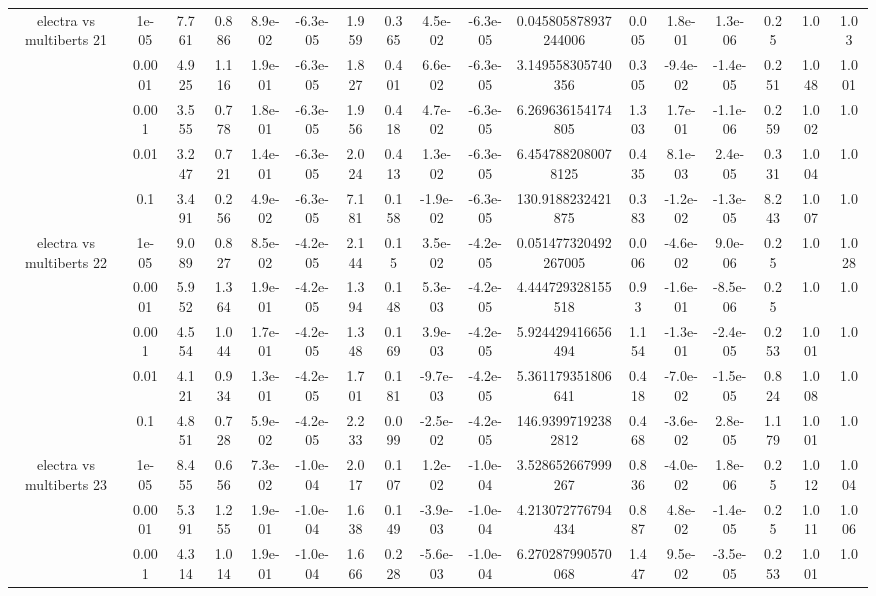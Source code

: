 \begin{tabular}{|c|c|c|c|c|c|c|c|c|c|c|c|c|c|c|c|c|}
\hline
\multirow{5}{*}{electra  vs multiberts 21} & 1e-05 & 7.761 & 0.886 & 8.9e-02 & -6.3e-05 & 1.959 & 0.365 & 4.5e-02 & -6.3e-05 & 0.045805878937244006 & 0.005 & 1.8e-01 & 1.3e-06 & 0.25 & 1.0 & 1.03 \\
 & 0.0001 & 4.925 & 1.116 & 1.9e-01 & -6.3e-05 & 1.827 & 0.401 & 6.6e-02 & -6.3e-05 & 3.149558305740356 & 0.305 & -9.4e-02 & -1.4e-05 & 0.251 & 1.048 & 1.001 \\
 & 0.001 & 3.555 & 0.778 & 1.8e-01 & -6.3e-05 & 1.956 & 0.418 & 4.7e-02 & -6.3e-05 & 6.269636154174805 & 1.303 & 1.7e-01 & -1.1e-06 & 0.259 & 1.002 & 1.0 \\
 & 0.01 & 3.247 & 0.721 & 1.4e-01 & -6.3e-05 & 2.024 & 0.413 & 1.3e-02 & -6.3e-05 & 6.4547882080078125 & 0.435 & 8.1e-03 & 2.4e-05 & 0.331 & 1.004 & 1.0 \\
 & 0.1 & 3.491 & 0.256 & 4.9e-02 & -6.3e-05 & 7.181 & 0.158 & -1.9e-02 & -6.3e-05 & 130.9188232421875 & 0.383 & -1.2e-02 & -1.3e-05 & 8.243 & 1.007 & 1.0 \\
\hline
\multirow{5}{*}{electra  vs multiberts 22} & 1e-05 & 9.089 & 0.827 & 8.5e-02 & -4.2e-05 & 2.144 & 0.15 & 3.5e-02 & -4.2e-05 & 0.051477320492267005 & 0.006 & -4.6e-02 & 9.0e-06 & 0.25 & 1.0 & 1.028 \\
 & 0.0001 & 5.952 & 1.364 & 1.9e-01 & -4.2e-05 & 1.394 & 0.148 & 5.3e-03 & -4.2e-05 & 4.444729328155518 & 0.93 & -1.6e-01 & -8.5e-06 & 0.25 & 1.0 & 1.0 \\
 & 0.001 & 4.554 & 1.044 & 1.7e-01 & -4.2e-05 & 1.348 & 0.169 & 3.9e-03 & -4.2e-05 & 5.924429416656494 & 1.154 & -1.3e-01 & -2.4e-05 & 0.253 & 1.001 & 1.0 \\
 & 0.01 & 4.121 & 0.934 & 1.3e-01 & -4.2e-05 & 1.701 & 0.181 & -9.7e-03 & -4.2e-05 & 5.361179351806641 & 0.418 & -7.0e-02 & -1.5e-05 & 0.824 & 1.008 & 1.0 \\
 & 0.1 & 4.851 & 0.728 & 5.9e-02 & -4.2e-05 & 2.233 & 0.099 & -2.5e-02 & -4.2e-05 & 146.93997192382812 & 0.468 & -3.6e-02 & 2.8e-05 & 1.179 & 1.001 & 1.0 \\
\hline
\multirow{5}{*}{electra  vs multiberts 23} & 1e-05 & 8.455 & 0.656 & 7.3e-02 & -1.0e-04 & 2.017 & 0.107 & 1.2e-02 & -1.0e-04 & 3.528652667999267 & 0.836 & -4.0e-02 & 1.8e-06 & 0.25 & 1.012 & 1.004 \\
 & 0.0001 & 5.391 & 1.255 & 1.9e-01 & -1.0e-04 & 1.638 & 0.149 & -3.9e-03 & -1.0e-04 & 4.213072776794434 & 0.887 & 4.8e-02 & -1.4e-05 & 0.25 & 1.011 & 1.006 \\
 & 0.001 & 4.314 & 1.014 & 1.9e-01 & -1.0e-04 & 1.666 & 0.228 & -5.6e-03 & -1.0e-04 & 6.270287990570068 & 1.447 & 9.5e-02 & -3.5e-05 & 0.253 & 1.001 & 1.0 \\

\end{tabular}
